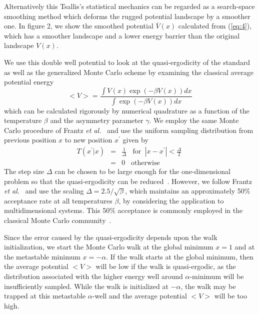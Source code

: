 Alternatively this Tsallis's statistical mechanics can be regarded 
as a search-space smoothing method which deforms the rugged potential 
landscape by a smoother one.  In figure 2, we show the smoothed 
potential $\overline{V}(x)$ calculated from (\ref{eq:4}), which has 
a smoother landscape and a lower energy barrier than the  
original landscape $V(x)$.

We use this double well potential to look at the quasi-ergodicity 
of the standard as well as the generalized Monte Carlo scheme by 
examining the classical average potential energy~\cite{FFD} 
\begin{equation}
<V>=\frac{\int V(x)\exp\left(-\beta V(x)\right)dx}
{\int \exp\left(-\beta V(x)\right)dx }
\label{eq:16}
\end{equation}
which can be calculated rigorously by numerical quadrature as a 
function of the temperature $\beta$ and the asymmetry parameter 
$\gamma$. We employ the same Monte Carlo procedure of Frantz 
{\it et al.}~\cite{FFD} and use the uniform sampling distribution 
from previous position $x$ to new position $x^{'}$ given by
\begin{eqnarray}
T(x^{'}|x)&=&\frac{1}{\Delta}\;\;\;\mbox{for}
\;\;|x-x^{'}|<\frac{\Delta}{2}\ \nonumber \\
&=& 0\;\;\;\mbox{otherwise}
\label{eq:17}
\end{eqnarray}
The step size $\Delta$ can be chosen to be large enough for the 
one-dimensional problem so that the quasi-ergodicity can
be reduced~\cite{FFD}.  However, we follow Frantz {\it et
al.}~\cite{FFD} and use the scaling $\Delta=2.5/\sqrt{\beta}$, 
which maintains an approximately 50\% acceptance rate at all 
temperatures $\beta$, by considering the application to 
multidimensional systems.  This 50\% acceptance is commonly 
employed in the classical Monte Carlo community~\cite{AT}.


Since the error caused by the quasi-ergodicity depends upon 
the walk initialization, we start the Monte Carlo walk at 
the global minimum $x=1$ and at the metastable minimum $x=-\alpha$. 
If the walk starts at the global minimum, then the average 
potential $<V>$ will be low if the walk is quasi-ergodic, as 
the distribution associated with the higher energy well around 
$\alpha$-minimum will be insufficiently sampled. While the walk 
is initialized at $-\alpha$, the walk may be trapped at this 
metastable $\alpha$-well and the average potential $<V>$ 
will be too high. 


